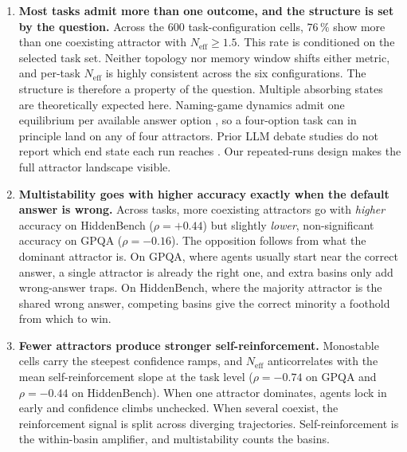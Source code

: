 \begin{enumerate}
\renewcommand{\labelenumi}{(\roman{enumi})}
  \item \textbf{Most tasks admit more than one outcome, and the structure is set by the question.}
        Across the 600 task-configuration cells, $76\,\%$ show more than one
        coexisting attractor with $N_{\mathrm{eff}} \geq 1.5$. This rate is conditioned
        on the selected task set. Neither topology nor memory window shifts either
        metric, and per-task $N_{\mathrm{eff}}$ is highly consistent across the six
        configurations. The structure is therefore a property of the question.
        Multiple absorbing states are theoretically expected here. Naming-game
        dynamics admit one equilibrium per available answer option
        \citep{baronchelli2018consensus, ashery2025conventions}, so a four-option
        task can in principle land on any of four attractors. Prior \ac{LLM} debate
        studies do not report which end state each run reaches
        \citep{cau2026agreementdrift, mehdizadeh2026topologymemory}. Our repeated-runs design makes the full
        attractor landscape visible.

  \item \textbf{Multistability goes with higher accuracy exactly when the default answer is wrong.} Across
        tasks, more coexisting attractors go with \emph{higher} accuracy on
        HiddenBench ($\rho = +0.44$) but slightly \emph{lower}, non-significant
        accuracy on GPQA ($\rho = -0.16$). The opposition follows from what the
        dominant attractor is. On GPQA, where agents usually start near the correct
        answer, a single attractor is already the right one, and extra basins only
        add wrong-answer traps. On HiddenBench, where the majority attractor is the
        shared wrong answer, competing basins give the correct minority a foothold
        from which to win.

  \item \textbf{Fewer attractors produce stronger self-reinforcement.} Monostable cells
        carry the steepest confidence ramps, and $N_{\mathrm{eff}}$ anticorrelates
        with the mean self-reinforcement slope at the task level ($\rho = -0.74$ on
        GPQA and $\rho = -0.44$ on HiddenBench). When one attractor dominates, agents
        lock in early and confidence climbs unchecked. When several coexist, the
        reinforcement signal is split across diverging trajectories.
        Self-reinforcement is the within-basin amplifier, and multistability counts
        the basins.
\end{enumerate}

